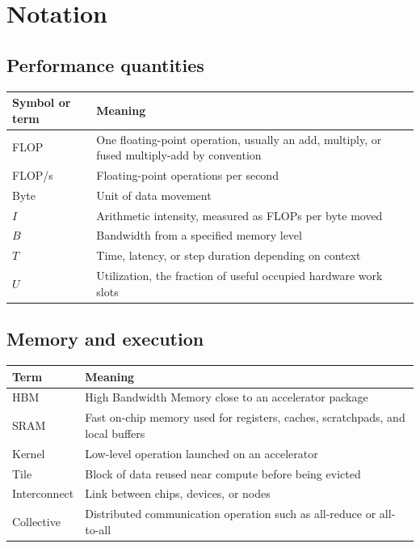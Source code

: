 \section*{Notation}

\subsection*{Performance quantities}

\begin{tabularx}{\textwidth}{@{}p{}X@{}}
  \toprule
  \textbf{Symbol or term} & \textbf{Meaning} \\
  \midrule
  FLOP & One floating-point operation, usually an add, multiply, or fused multiply-add by convention \\
  FLOP/s & Floating-point operations per second \\
  Byte & Unit of data movement \\
  \(I\) & Arithmetic intensity, measured as FLOPs per byte moved \\
  \(B\) & Bandwidth from a specified memory level \\
  \(T\) & Time, latency, or step duration depending on context \\
  \(U\) & Utilization, the fraction of useful occupied hardware work slots \\
  \bottomrule
\end{tabularx}

\subsection*{Memory and execution}

\begin{tabularx}{\textwidth}{@{}p{}X@{}}
  \toprule
  \textbf{Term} & \textbf{Meaning} \\
  \midrule
  HBM & High Bandwidth Memory close to an accelerator package \\
  SRAM & Fast on-chip memory used for registers, caches, scratchpads, and local buffers \\
  Kernel & Low-level operation launched on an accelerator \\
  Tile & Block of data reused near compute before being evicted \\
  Interconnect & Link between chips, devices, or nodes \\
  Collective & Distributed communication operation such as all-reduce or all-to-all \\
  \bottomrule
\end{tabularx}

